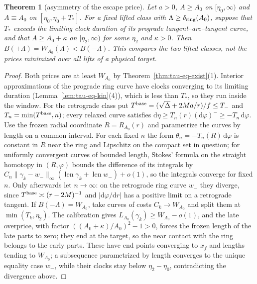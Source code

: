 \documentclass[aip,jmp,amsmath,amssymb,reprint]{revtex4-2}
\newcommand{\dd}{\mathrm{d}}
\theoremstyle{plain}
\newtheorem{theorem}{Theorem}
\theoremstyle{definition}
\begin{document}
\begin{theorem}[asymmetry of the escape price]\label{thm:tau-eq-asym}
Let $a>0$, $A\ge A_0$ on $[\eta_0,\infty)$ and $A\equiv A_0$ on $[\eta_0,\eta_0+T_*]$. For a fixed lifted
class with $\Lambda\ge\delta_{\rm ring}(A_0)$, suppose that $T_*$ exceeds the limiting clock duration of its
prograde tangent--arc--tangent curve, and that $A\ge A_0+\kappa$ on $[\eta_2,\infty)$ for some $\eta_2$ and
$\kappa>0$. Then $B(+\Lambda)=W_{A_0}(\Lambda)<B(-\Lambda)$. This compares the two lifted classes, not the
prices minimized over all lifts of a physical target.
\end{theorem}

\begin{proof}
Both prices are at least $W_{A_0}$ by Theorem~\ref{thm:tau-eq-exist}(1). Interior approximations of
the prograde ring curve have clocks converging to its limiting duration
(Lemma~\ref{lem:tau-eq-kin}(4)), which is less than $T_*$, so they run inside the window. For the
retrograde class put $T^{\rm base}=(\sqrt\Delta+2Ma/r)/f\le T_-$ and $T_n=\min(T^{\rm base},n)$; every relaxed
curve satisfies $\dd\eta\ge T_n(r)(\dd\varphi)^-\ge-T_n\,\dd\varphi$. Use the frozen radial coordinate $R=R_{A_0}(r)$
and parametrize the curves by length on a common interval. For each fixed $n$ the form
$\theta_n=-T_n(R)\,\dd\varphi$ is constant in $R$ near the ring and Lipschitz on the compact set in question;
for uniformly convergent curves of bounded length, Stokes' formula on the straight homotopy in
$(R,\varphi)$ bounds the difference of its integrals by
$C_n\|\gamma_k-w_-\|_\infty(\operatorname{len}\gamma_k+\operatorname{len}w_-)+o(1)$, so the integrals converge for fixed
$n$. Only afterwards let $n\to\infty$: on the retrograde ring curve $w_-$ they diverge, since
$T^{\rm base}\asymp(r-2M)^{-1}$ and $|\dd\varphi/\dd r|$ has a positive limit on a retrograde tangent. If
$B(-\Lambda)=W_{A_0}$, take curves of costs $C_k\to W_{A_0}$ and split them at $\min(T_k,\eta_2)$. The calibration gives
$L_{A_0}(\gamma_k)\ge W_{A_0}-o(1)$, and the late overprice, with factor $((A_0+\kappa)/A_0)^2-1>0$, forces the
frozen length of the late parts to zero; they end at the target, so the near contact with the ring
belongs to the early parts. These have end points converging to $x_f$ and lengths tending to
$W_{A_0}$; a subsequence parametrized by length converges to the unique equality case $w_-$, while
their clocks stay below $\eta_2-\eta_0$, contradicting the divergence above.
\end{proof}
\end{document}
